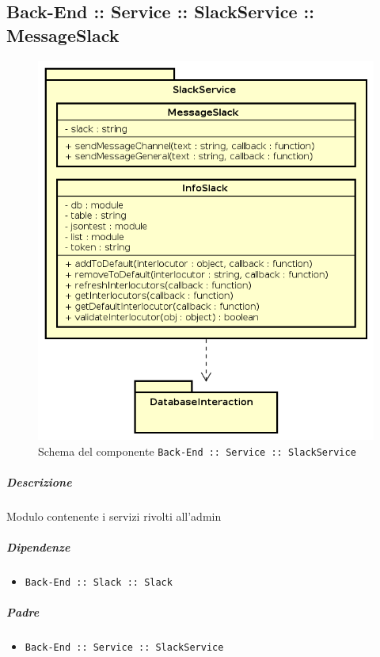 \documentclass[../ManualeSviluppatore_v2.0.0.tex]{subfiles}
\begin{document}
\subsection{Back-End :: Service :: SlackService :: MessageSlack}
\begin{figure}[!h]
	\centering
	\includegraphics[scale=0.6]{Architettura/Back-End/Service/SlackService.png}
	\caption{Schema del componente \texttt{Back-End :: Service :: SlackService}}
\end{figure}
\subparagraph{Descrizione} Modulo contenente i servizi rivolti all'admin
\subparagraph{Dipendenze}
\begin{itemize}
	\item \texttt{Back-End :: Slack :: Slack}
\end{itemize}
\subparagraph{Padre}
\begin{itemize}
	\item \texttt{Back-End :: Service :: SlackService}
\end{itemize}
\end{document}
